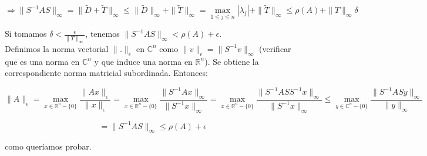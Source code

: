 $$\Rightarrow \|S^{-1}AS\|_{\infty} = \|\tilde{D} + \tilde{T}\|_{\infty} \leq \|\tilde{D}\|_{\infty} + \|\tilde{T}\|_{\infty} = \max \limits_{1 \leq j \leq n} |\lambda_{j}| + \|\tilde{T}\|_{\infty} \leq \rho(A) + \|T\|_{\infty}\delta$$

Si tomamos $\delta < \frac{\epsilon}{\|T\|_{\infty}}$, tenemos $\|S^{-1}AS\|_{\infty} < \rho(A) + \epsilon$.\\

Definimos la norma vectorial $\|.\|_{\epsilon}$ en $\mathbb{C}^{n}$ como $\|v\|_{\epsilon} = \|S^{-1}v\|_{\infty}$ (verificar que es una norma en $\mathbb{C}^{n}$ y que induce una norma en $\mathbb{R}^{n}$). Se obtiene la correspondiente norma matricial subordinada. Entonces:

$$\|A\|_{\epsilon} = \max \limits_{x \in \mathbb{R}^{n} - \{0\}} \frac{\|Ax\|_{\epsilon}}{\|x\|_{\epsilon}} = \max \limits_{x \in \mathbb{R}^{n} - \{0\}} \frac{\|S^{-1}Ax\|_{\infty}}{\|S^{-1}x\|_{\infty}} = \max \limits_{x \in \mathbb{R}^{n} - \{0\}} \frac{\|S^{-1}ASS^{-1}x\|_{\infty}}{\|S^{-1}x\|_{\infty}} \leq \max \limits_{y \in \mathbb{C}^{n} - \{0\}} \frac{\|S^{-1}ASy\|_{\infty}}{\|y\|_{\infty}}$$

$$= \|S^{-1}AS\|_{\infty} \leq \rho(A) + \epsilon$$

como quer\'iamos probar.